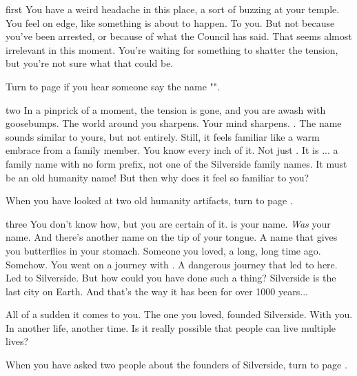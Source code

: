 \documentclass[greennotebook]{Silversiders} %
\begin{document}
\startnotebook{\nIngenuityGreen{}}

\begin{page}{first}
You have a weird headache in this place, a sort of buzzing at your temple. You feel on edge, like something is about to happen. To you. But not because you've been arrested, or because of what the Council has said. That seems almost irrelevant in this moment. You're waiting for something to shatter the tension, but you're not sure what that could be.

Turn to page  if you hear someone say the name "\cIngenuityOld{}".
\end{page}

\begin{page}{two}
In a pinprick of a moment, the tension is gone, and you are awash with goosebumps. The world around you sharpens. Your mind sharpens. \cIngenuityOld{}. The name sounds similar to yours, but not entirely. Still, it feels familiar like a warm embrace from a family member. You know every inch of it. Not just \cIngenuityOld{}. It is \cIngenuityOld{\intro}... a family name with no form prefix, not one of the Silverside family names. It must be an old humanity name! But then why does it feel so familiar to you?

When you have looked at two old humanity artifacts, turn to page .
\end{page}

\begin{page}{three}
You don't know how, but you are certain of it. \cIngenuityOld{\intro} is your name. \emph{Was} your name. And there's another name on the tip of your tongue. A name that gives you butterflies in your stomach. Someone you loved, a long, long time ago. Somehow. You went on a journey with \cIngenuityOld{\them}. A dangerous journey that led to here. Led to Silverside. But how could you have done such a thing? Silverside is the last city on Earth. And that's the way it has been for over 1000 years...

All of a sudden it comes to you. The one you loved, \cSavior{\they} founded Silverside. With you. In another life, another time. Is it really possible that people can live multiple lives?

When you have asked two people about the founders of Silverside, turn to page .
\end{page}
\end{document}
